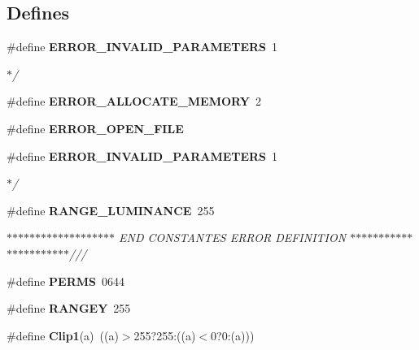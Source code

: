 \subsection*{Defines}
\begin{DoxyCompactItemize}
\item 
\#define {\bf ERROR\_\-INVALID\_\-PARAMETERS}~1
\begin{DoxyCompactList}\small\item\em $\ast$/ \end{DoxyCompactList}\item 
\#define {\bf ERROR\_\-ALLOCATE\_\-MEMORY}~2
\item 
\#define {\bf ERROR\_\-OPEN\_\-FILE}
\item 
\#define {\bf ERROR\_\-INVALID\_\-PARAMETERS}~1
\begin{DoxyCompactList}\small\item\em $\ast$/ \end{DoxyCompactList}\item 
\#define {\bf RANGE\_\-LUMINANCE}~255
\begin{DoxyCompactList}\small\item\em $\ast$$\ast$$\ast$$\ast$$\ast$$\ast$$\ast$$\ast$$\ast$$\ast$$\ast$$\ast$$\ast$$\ast$$\ast$$\ast$$\ast$$\ast$$\ast$ END CONSTANTES ERROR DEFINITION $\ast$$\ast$$\ast$$\ast$$\ast$$\ast$$\ast$$\ast$$\ast$$\ast$$\ast$$\ast$$\ast$$\ast$$\ast$$\ast$$\ast$$\ast$$\ast$$\ast$$\ast$$\ast$/// \end{DoxyCompactList}\item 
\#define {\bf PERMS}~0644
\item 
\#define {\bf RANGEY}~255
\item 
\#define {\bf Clip1}(a)~((a)$>$255?255:((a)$<$0?0:(a)))
\end{DoxyCompactItemize}

